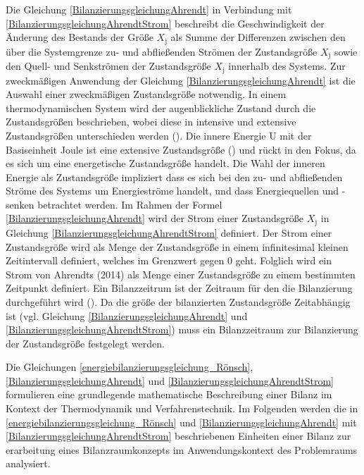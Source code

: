 Die Gleichung \eqref{BilanzierungsgleichungAhrendt} in Verbindung mit \eqref{BilanzierungsgleichungAhrendtStrom} beschreibt die Geschwindigkeit der Änderung des Bestands der Größe
\(X_{\text{j}}\) als Summe der Differenzen zwischen den über die Systemgrenze zu- und abfließenden Strömen der Zustandsgröße
\(X_{\text{j}}\) sowie den Quell- und Senkströmen der Zustandsgröße \(X_{\text{j}}\) innerhalb des Systems.  
Zur zweckmäßigen Anwendung der Gleichung \eqref{BilanzierungsgleichungAhrendt} ist die Auswahl einer zweckmäßigen Zustandsgröße notwendig.
In einem thermodynamischen System wird der augenblickliche Zustand durch die Zustandsgrößen beschrieben, wobei diese in intensive und extensive Zustandsgrößen 
unterschieden werden (\cite[S. 66]{Konstantin.2023}). 
Die innere Energie U mit der Basiseinheit Joule ist eine extensive Zustandsgröße 
(\cite[S. 65]{Konstantin.2023}) und rückt in den Fokus, da es sich um eine energetische Zustandsgröße handelt.
Die Wahl der inneren Energie als Zustandsgröße impliziert dass es sich bei den zu- und abfließenden Ströme des Systems um Energieströme handelt, 
und dass Energiequellen und -senken betrachtet werden. 
Im Rahmen der Formel \eqref{BilanzierungsgleichungAhrendt} wird der Strom einer Zustandsgröße \(X_{\text{j}}\) in Gleichung \eqref{BilanzierungsgleichungAhrendtStrom} definiert.
Der Strom einer Zustandsgröße wird als Menge der Zustandsgröße in einem infinitesimal kleinen Zeitintervall definiert, welches im Grenzwert gegen 0 geht.
Folglich wird ein Strom von Ahrendts (2014) als Menge einer Zustandsgröße zu einem bestimmten Zeitpunkt definiert.
Ein Bilanzzeitrum ist der Zeitraum für den die Bilanzierung durchgeführt wird (\cite[S. 117]{Hall.2014}).
Da die größe der bilanzierten Zustandsgröße Zeitabhängig ist (vgl. Gleichung \eqref{BilanzierungsgleichungAhrendt} und \eqref{BilanzierungsgleichungAhrendtStrom}) muss ein 
Bilanzzeitraum zur Bilanzierung der Zustandsgröße festgelegt werden.

Die Gleichungen \eqref{energiebilanzierungsgleichung_Rönsch},\eqref{BilanzierungsgleichungAhrendt} und \eqref{BilanzierungsgleichungAhrendtStrom} 
formulieren eine grundlegende mathematische Beschreibung einer Bilanz im Kontext der Thermodynamik und 
Verfahrenstechnik. 
Im Folgenden werden die in \eqref{energiebilanzierungsgleichung_Rönsch} und \eqref{BilanzierungsgleichungAhrendt} mit \eqref{BilanzierungsgleichungAhrendtStrom} 
beschriebenen Einheiten einer Bilanz zur erarbeitung eines Bilanzraumkonzepts im Anwendungskontext des Problemraums analysiert.